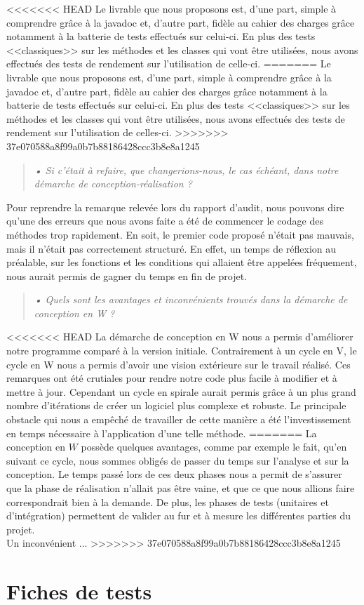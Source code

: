 \documentclass[12pt,a4paper]{report}
\begin{document}
<<<<<<< HEAD
Le livrable que nous proposons est, d'une part, simple à comprendre grâce à la javadoc et, d'autre part, fidèle au cahier des charges grâce notamment à la batterie de tests effectués sur celui-ci. En plus des tests <<classiques>> sur les méthodes et les classes qui vont être utilisées, nous avons effectués des tests de rendement sur l'utilisation de celle-ci. 
=======
Le livrable que nous proposons est, d'une part, simple à comprendre grâce à la javadoc et, d'autre part, fidèle au cahier des charges grâce notamment à la batterie de tests effectués sur celui-ci. En plus des tests <<classiques>> sur les méthodes et les classes qui vont être utilisées, nous avons effectués des tests de rendement sur l'utilisation de celles-ci.
>>>>>>> 37e070588a8f99a0b7b88186428ccc3b8e8a1245

\begin{quotation}
\textit{• Si c'était à refaire, que changerions-nous, le cas échéant, dans notre démarche de conception-réalisation ?}
\end{quotation}

Pour reprendre la remarque relevée lors du rapport d'audit, nous pouvons dire qu'une des erreurs que nous avons faite a été de commencer le codage des méthodes trop rapidement. En soit, le premier code proposé n'était pas mauvais, mais il n'était pas correctement structuré. En effet, un temps de réflexion au préalable, sur les fonctions et les conditions qui allaient être appelées fréquement, nous aurait permis de gagner du temps en fin de projet. 

\begin{quotation}
\textit{• Quels sont les avantages et inconvénients trouvés dans la démarche de conception en W ?}
\end{quotation}

<<<<<<< HEAD
La démarche de conception en W nous a permis d'améliorer notre programme comparé à la version initiale. Contrairement à un cycle en V, le cycle en W nous a permis d'avoir une vision extérieure sur le travail réalisé. Ces remarques ont été crutiales pour rendre notre code plus facile à modifier et à mettre à jour. Cependant un cycle en spirale aurait permis grâce à un plus grand nombre d'itérations de créer un logiciel plus complexe et robuste. Le principale obstacle qui nous a empêché de travailler de cette manière a été l'investissement en temps nécessaire à l'application d'une telle méthode. 
=======
La conception en $W$ possède quelques avantages, comme par exemple le fait, qu'en suivant ce cycle, nous sommes obligés de passer du temps sur l'analyse et sur la conception. Le temps passé lors de ces deux phases nous a permit de s'assurer que la phase de réalisation n'allait pas être vaine, et que ce que nous allions faire correspondrait bien à la demande. De plus, les phases de tests (unitaires et d'intégration) permettent de valider au fur et à mesure les différentes parties du projet.\\

Un inconvénient ...
>>>>>>> 37e070588a8f99a0b7b88186428ccc3b8e8a1245

\appendix
\chapter{Fiches de tests}
\end{document}
